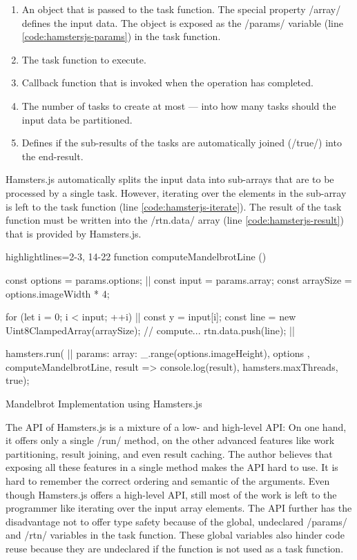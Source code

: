 \begin{enumerate}
	\item An object that is passed to the task function. The special property \javascriptinline/array/ defines the input data. The object is exposed as the \javascriptinline/params/ variable (line \ref{code:hamstersjs-params}) in the task function.
	\item The task function to execute.
	\item Callback function that is invoked when the operation has completed.
	\item The number of tasks to create at most --- into how many tasks should the input data be partitioned. 
	\item Defines if the sub-results of the tasks are automatically joined (\javascriptinline/true/) into the end-result.
\end{enumerate}

Hamsters.js automatically splits the input data into sub-arrays that are to be processed by a single task. However, iterating over the elements in the sub-array is left to the task function (line \ref{code:hamsterjs-iterate}). The result of the task function must be written into the \javascriptinline/rtn.data/ array (line \ref{code:hamsterjs-result}) that is provided by Hamsters.js. 

\begin{listing}
\begin{javascriptcode*}{highlightlines={2-3, 14-22}}
function computeMandelbrotLine () {
	const options = params.options; |$\label{code:hamstersjs-params}$|
	const input = params.array;
	const arraySize = options.imageWidth * 4;

	for (let i = 0; i < input; ++i) {|$\label{code:hamsterjs-iterate}$|
		const y = input[i];
		const line = new Uint8ClampedArray(arraySize);
		// compute...
		rtn.data.push(line); |$\label{code:hamsterjs-result}$|
	}
}

hamsters.run( |$\label{code:hamsterjs-start}$|
	params: {
		array: _.range(options.imageHeight),
		options
	},  
	computeMandelbrotLine, 
	result => console.log(result), 
	hamsters.maxThreads, 
	true);
\end{javascriptcode*}
\caption{Mandelbrot Implementation using Hamsters.js}
\label{fig:mandelbrot-hamsterjs}
\end{listing}

The API of Hamsters.js is a mixture of a low- and high-level API: On one hand, it offers only a single \javascriptinline/run/ method, on the other advanced features like work partitioning, result joining, and even result caching. The author believes that exposing all these features in a single method makes the API hard to use. It is hard to remember the correct ordering and semantic of the arguments. Even though Hamsters.js offers a high-level API, still most of the work is left to the programmer like iterating over the input array elements. The API further has the disadvantage not to offer type safety because of the global, undeclared \javascriptinline/params/ and \javascriptinline/rtn/ variables in the task function. These global variables also hinder code reuse because they are undeclared if the function is not used as a task function. 


